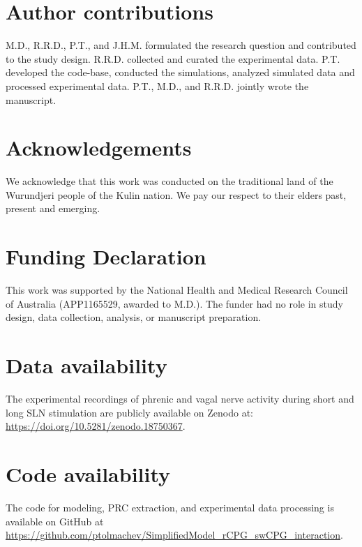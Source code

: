 \documentclass[pdflatex,sn-mathphys-ay]{sn-jnl}%
\theoremstyle{thmstyleone}%
\theoremstyle{thmstyletwo}%
\theoremstyle{thmstylethree}%
\begin{document}


\section*{Author contributions}
M.D., R.R.D., P.T., and J.H.M. formulated the research question and contributed to the study design. R.R.D. collected and curated the experimental data. P.T. developed the code-base, conducted the simulations, analyzed simulated data and processed experimental data. P.T., M.D., and R.R.D. jointly wrote the manuscript.

\section*{Acknowledgements}
We acknowledge that this work was conducted on the traditional land of the Wurundjeri people of the Kulin nation. We pay our respect to their elders past, present and emerging.

\section*{Funding Declaration}
This work was supported by the National Health and Medical Research Council of Australia (APP1165529, awarded to M.D.). The funder had no role in study design, data collection, analysis, or manuscript preparation.

\section*{Data availability}
The experimental recordings of phrenic and vagal nerve activity during short and long SLN stimulation are publicly available on Zenodo at:
\href{https://zenodo.org/records/18750367}{https://doi.org/10.5281/zenodo.18750367}.

\section*{Code availability}
The code for modeling, PRC extraction, and experimental data processing is available on GitHub at \href{https://github.com/ptolmachev/SimplifiedModel_rCPG_swCPG_interaction}{https://github.com/ptolmachev/SimplifiedModel\_rCPG\_swCPG\_interaction}.
\end{document}
